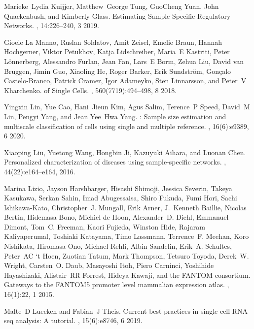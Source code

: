 \documentclass[10pt, a4paper]{article}
\begin{document}
\begin{thebibliography}{10}
	Marieke~Lydia Kuijjer, Matthew~George Tung, GuoCheng Yuan, John Quackenbush,
	and Kimberly Glass.
	\newblock Estimating {{Sample}}-{{Specific Regulatory Networks}}.
	, 14:226--240, 3 2019.
	
	Gioele {La Manno}, Ruslan Soldatov, Amit Zeisel, Emelie Braun, Hannah
	Hochgerner, Viktor Petukhov, Katja Lidschreiber, Maria~E Kastriti, Peter
	L{\"o}nnerberg, Alessandro Furlan, Jean Fan, Lars~E Borm, Zehua Liu, David
	{van Bruggen}, Jimin Guo, Xiaoling He, Roger Barker, Erik Sundstr{\"o}m,
	Gon{\c c}alo Castelo-Branco, Patrick Cramer, Igor Adameyko, Sten Linnarsson,
	and Peter~V Kharchenko.
	 of {{Single Cells}}.
	, 560(7719):494--498, 8 2018.
	
	Yingxin Lin, Yue Cao, Hani~Jieun Kim, Agus Salim, Terence~P Speed, David~M Lin,
	Pengyi Yang, and Jean Yee~Hwa Yang.
	: Sample size estimation and multiscale classification
	of cells using single and multiple reference.
	, 16(6):e9389, 6 2020.
	
	Xiaoping Liu, Yuetong Wang, Hongbin Ji, Kazuyuki Aihara, and Luonan Chen.
	\newblock Personalized characterization of diseases using sample-specific
	networks.
	, 44(22):e164--e164, 2016.
	
	Marina Lizio, Jayson Harshbarger, Hisashi Shimoji, Jessica Severin, Takeya
	Kasukawa, Serkan Sahin, Imad Abugessaisa, Shiro Fukuda, Fumi Hori, Sachi
	Ishikawa-Kato, Christopher~J. Mungall, Erik Arner, J.~Kenneth Baillie,
	Nicolas Bertin, Hidemasa Bono, Michiel {de Hoon}, Alexander~D. Diehl,
	Emmanuel Dimont, Tom~C. Freeman, Kaori Fujieda, Winston Hide, Rajaram
	Kaliyaperumal, Toshiaki Katayama, Timo Lassmann, Terrence~F. Meehan, Koro
	Nishikata, Hiromasa Ono, Michael Rehli, Albin Sandelin, Erik~A. Schultes,
	Peter~AC {`t Hoen}, Zuotian Tatum, Mark Thompson, Tetsuro Toyoda, Derek~W.
	Wright, Carsten~O. Daub, Masayoshi Itoh, Piero Carninci, Yoshihide
	Hayashizaki, Alistair~RR Forrest, Hideya Kawaji, and {the FANTOM consortium}.
	\newblock Gateways to the {{FANTOM5}} promoter level mammalian expression
	atlas.
	, 16(1):22, 1 2015.
	
	Malte~D Luecken and Fabian~J Theis.
	\newblock Current best practices in single-cell {{RNA}}-seq analysis: A
	tutorial.
	, 15(6):e8746, 6 2019.
	

\end{thebibliography}
\end{document}
